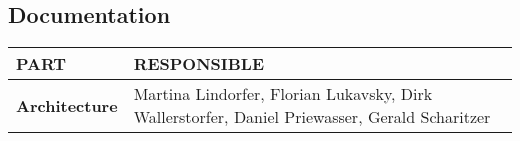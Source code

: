 \documentclass[a4paper]{article}
\begin{document}
\vspace{1cm}

\subsection*{Documentation}

\begin{small}
\begin{tabular}{| p{4cm} | p{9cm} |}\hline
\textbf{PART} & \textbf{RESPONSIBLE}\\\hline\hline
\textbf{Architecture} & Martina Lindorfer, Florian Lukavsky, Dirk Wallerstorfer, Daniel Priewasser, Gerald Scharitzer\\\hline
\end{tabular}
\end{small}
\end{document}
